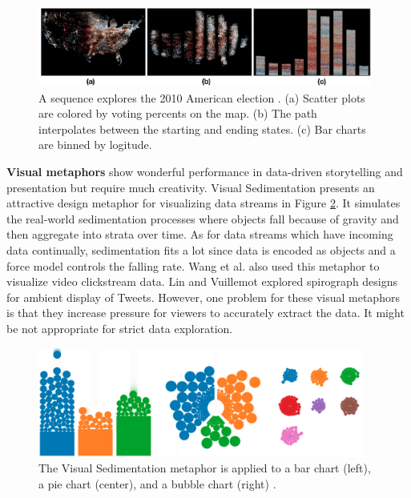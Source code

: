 \begin{figure}[H]
	\centering 
	\includegraphics[width=0.98\textwidth]{figure/SandDance.png} 
	\caption{ A sequence explores the 2010 American election \cite{Drucker2015}. (a) Scatter plots are colored by voting percents on the map. (b) The path interpolates between the starting and ending states. (c) Bar charts are binned by logitude. } 
	\label{sandDance} 
\end{figure}

\textbf{Visual metaphors} show wonderful performance in data-driven storytelling and presentation but require much creativity. Visual Sedimentation \cite{Huron2013} presents an attractive design metaphor for visualizing data streams in Figure \ref{sedimentation}. It simulates the real-world sedimentation processes where objects fall because of gravity and then aggregate into strata over time. As for data streams which have incoming data continually, sedimentation fits a lot since data is encoded as objects and a force model controls the falling rate. Wang et al. \cite{Wang2016} also used this metaphor to visualize video clickstream data. Lin and Vuillemot \cite{Lin2013} explored spirograph designs for ambient display of Tweets. However, one problem for these visual metaphors is that they increase pressure for viewers to accurately extract the data. It might be not appropriate for strict data exploration.

\begin{figure}[htb]
	\centering 
	\includegraphics[width=0.95\textwidth]{figure/sedimentation.png} 
	\caption{ The Visual Sedimentation metaphor is applied to a bar chart (left), a pie chart (center), and a bubble chart (right) \cite{Huron2013}. } 
	\label{sedimentation} 
\end{figure}

